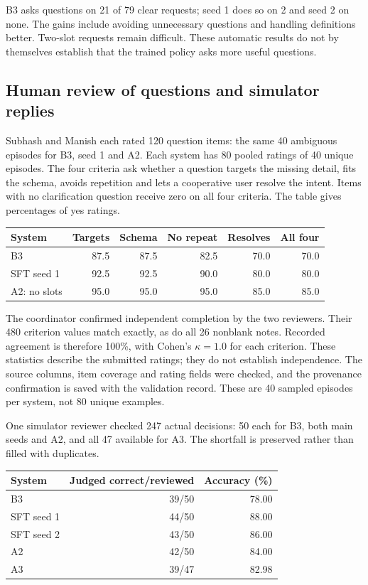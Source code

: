 \documentclass[11pt,a4paper]{article}
\begin{document}
B3 asks questions on 21 of 79 clear requests; seed 1 does so on 2 and seed 2 on none. The gains include
avoiding unnecessary questions and handling definitions better. Two-slot requests remain difficult.
These automatic results do not by themselves establish that the trained policy asks more useful questions.

\subsection{Human review of questions and simulator replies}

Subhash and Manish each rated 120 question items: the same 40 ambiguous episodes for B3, seed 1 and A2.
Each system has 80 pooled ratings of 40 unique episodes. The four criteria ask whether a question targets
the missing detail, fits the schema, avoids repetition and lets a cooperative user resolve the intent.
Items with no clarification question receive zero on all four criteria. The table gives percentages of yes ratings.

\begin{center}
\small
\begin{tabular}{lrrrrr}
\toprule
System & Targets & Schema & No repeat & Resolves & All four \\
\midrule
B3 & 87.5 & 87.5 & 82.5 & 70.0 & 70.0 \\
SFT seed 1 & 92.5 & 92.5 & 90.0 & 80.0 & 80.0 \\
A2: no slots & 95.0 & 95.0 & 95.0 & 85.0 & 85.0 \\
\bottomrule
\end{tabular}
\end{center}

The coordinator confirmed independent completion by the two reviewers. Their 480 criterion values match
exactly, as do all 26 nonblank notes. Recorded agreement is therefore 100\%, with Cohen's $\kappa=1.0$
for each criterion. These statistics describe the submitted ratings; they do not establish independence.
The source columns, item coverage and rating fields were checked, and the provenance confirmation is saved
with the validation record. These are 40 sampled episodes per system, not 80 unique examples.

One simulator reviewer checked 247 actual decisions: 50 each for B3, both main seeds and A2, and all 47
available for A3. The shortfall is preserved rather than filled with duplicates.

\begin{center}
\begin{tabular}{lrr}
\toprule
System & Judged correct/reviewed & Accuracy (\%) \\
\midrule
B3 & 39/50 & 78.00 \\
SFT seed 1 & 44/50 & 88.00 \\
SFT seed 2 & 43/50 & 86.00 \\
A2 & 42/50 & 84.00 \\
A3 & 39/47 & 82.98 \\
\bottomrule
\end{tabular}
\end{center}
\end{document}
